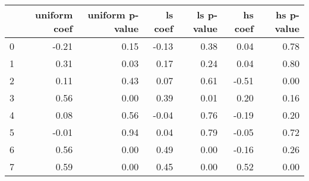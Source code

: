 \begin{tabular}{lrrrrrr}
\toprule
 & uniform coef & uniform p-value & ls coef & ls p-value & hs coef & hs p-value \\
\midrule
0 & -0.21 & 0.15 & -0.13 & 0.38 & 0.04 & 0.78 \\
1 & 0.31 & 0.03 & 0.17 & 0.24 & 0.04 & 0.80 \\
2 & 0.11 & 0.43 & 0.07 & 0.61 & -0.51 & 0.00 \\
3 & 0.56 & 0.00 & 0.39 & 0.01 & 0.20 & 0.16 \\
4 & 0.08 & 0.56 & -0.04 & 0.76 & -0.19 & 0.20 \\
5 & -0.01 & 0.94 & 0.04 & 0.79 & -0.05 & 0.72 \\
6 & 0.56 & 0.00 & 0.49 & 0.00 & -0.16 & 0.26 \\
7 & 0.59 & 0.00 & 0.45 & 0.00 & 0.52 & 0.00 \\
\bottomrule
\end{tabular}
